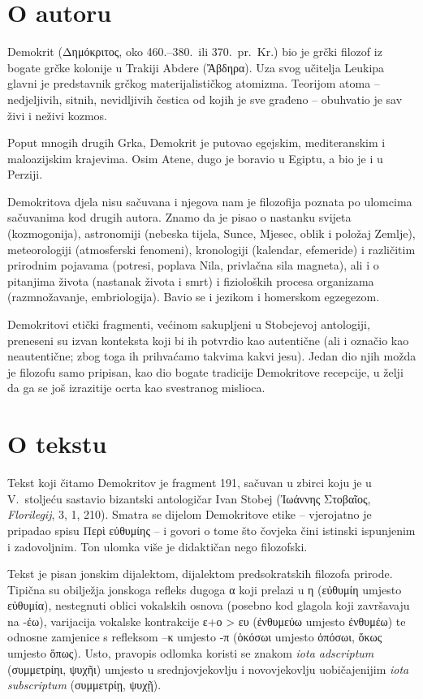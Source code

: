 \section*{O autoru}

Demokrit (Δημόκριτος, oko 460.–380.\ ili 370.\ pr.~Kr.) bio je grčki filozof iz bogate grčke kolonije u Trakiji Abdere (Ἄβδηρα). Uza svog učitelja Leukipa glavni je predstavnik grčkog materijalističkog atomizma. Teorijom atoma – nedjeljivih, sitnih, nevidljivih čestica od kojih je sve građeno – obuhvatio je sav živi i neživi kozmos.

Poput mnogih drugih Grka, Demokrit je putovao egejskim, mediteranskim i maloazijskim krajevima. Osim Atene, dugo je boravio u Egiptu, a bio je i u Perziji.

Demokritova djela nisu sačuvana i njegova nam je filozofija poznata po ulomcima sačuvanima kod drugih autora. Znamo da je pisao o nastanku svijeta (kozmogonija), astronomiji (nebeska tijela, Sunce, Mjesec, oblik i položaj Zemlje), meteorologiji (atmosferski fenomeni), kronologiji (kalendar, efemeride) i različitim prirodnim pojavama (potresi, poplava Nila, privlačna sila magneta), ali i o pitanjima života (nastanak života i smrt) i fizioloških procesa organizama (razmnožavanje, embriologija). Bavio se i jezikom i homerskom egzegezom.

Demokritovi etički fragmenti, većinom sakupljeni u Stobejevoj antologiji, preneseni su izvan konteksta koji bi ih potvrdio kao autentične (ali i označio kao neautentične; zbog toga ih prihvaćamo takvima kakvi jesu). Jedan dio njih možda je filozofu samo pripisan, kao dio bogate tradicije Demokritove recepcije, u želji da ga se još izrazitije ocrta kao svestranog mislioca.

\section*{O tekstu}

Tekst koji čitamo Demokritov je fragment 191, sačuvan u zbirci koju je u V.~stoljeću sastavio bizantski antologičar Ivan Stobej (Ἰωάννης Στοβαῖος, \textit{Florilegij}, 3, 1, 210). Smatra se dijelom Demokritove etike – vjerojatno je pripadao spisu Περὶ εὐθυμίης – i govori o tome što čovjeka čini istinski ispunjenim i zadovoljnim. Ton ulomka više je didaktičan nego filozofski.

Tekst je pisan jonskim dijalektom, dijalektom predsokratskih filozofa prirode. Tipična su obilježja jonskoga refleks dugoga α koji prelazi u η (εὐθυμίη umjesto εὐθυμία), nestegnuti oblici vokalskih osnova (posebno kod glagola koji završavaju na -έω), varijacija vokalske kontrakcije ε+ο > ευ (ἐνθυμεύω umjesto ἐνθυμέω) te odnosne zamjenice s refleksom –κ umjesto -π  (ὁκόσωι umjesto ὁπόσωι, ὅκως umjesto ὅπως). Usto, pravopis odlomka koristi se znakom \textit{iota adscriptum} (συμμετρίηι, ψυχῆι) umjesto u srednjovjekovlju i novovjekovlju uobičajenijim \textit{iota subscriptum} (συμμετρίῃ, ψυχῇ).

